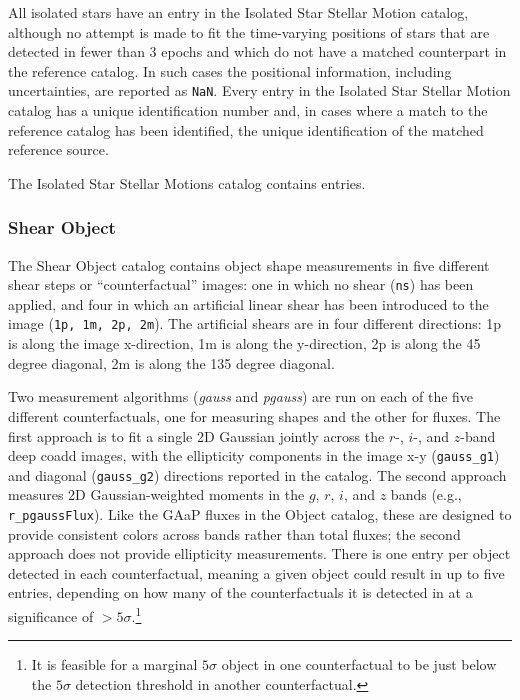 All isolated stars have an entry in the Isolated Star Stellar Motion catalog, although no attempt is made to fit the time-varying positions of stars that are detected in fewer than 3 epochs and which do not have a matched counterpart in the reference catalog.
In such cases the positional information, including uncertainties, are reported as \texttt{NaN}.
Every entry in the Isolated Star Stellar Motion catalog has a unique identification number and, in cases where a match to the reference catalog has been identified, the unique identification of the matched reference source.

The Isolated Star Stellar Motions catalog contains \nisolatedstars entries.

\subsubsection{Shear Object}
\label{sssec:objectshear}
The Shear Object catalog contains object \gls{shape} measurements in five different shear steps or ``counterfactual'' images: one in which no shear (\texttt{ns}) has been applied, and four in which an artificial linear shear has been introduced to the image (\texttt{1p, 1m, 2p, 2m}).
The artificial shears are in four different directions: 1p is along the image x-direction, 1m is along the y-direction, 2p is along the 45 degree diagonal, 2m is along the 135 degree diagonal.

Two measurement algorithms (\textit{gauss} and \textit{pgauss}) are run on each of the five different counterfactuals, one for measuring shapes and the other for fluxes.
The first approach is to fit a single \gls{2D} Gaussian jointly across the $r$-, $i$-, and $z$-band deep coadd images, with the ellipticity components in the image x-y (\texttt{gauss\_g1}) and diagonal (\texttt{gauss\_g2}) directions reported in the catalog.
The second approach measures \gls{2D} Gaussian-weighted moments in the $g$, $r$, $i$, and $z$ bands (e.g., \texttt{r\_pgaussFlux}).
Like the \gls{GAaP} fluxes in the Object catalog, these are designed to provide consistent colors across bands rather than total fluxes; the second approach does not provide ellipticity measurements.
There is one entry per object detected in each counterfactual, meaning a given object could result in up to five entries, depending on how many of the counterfactuals it is detected in at a significance of $>5\sigma$.\footnote{It is feasible for a marginal $5\sigma$ object in one counterfactual to be just below the $5\sigma$ detection threshold in another counterfactual.}

